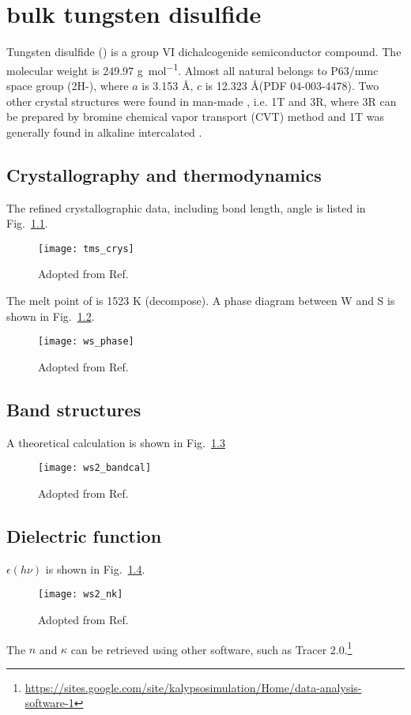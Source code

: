 \chapter{bulk tungsten disulfide}



Tungsten disulfide () is a group VI dichalcogenide semiconductor compound. The molecular weight is 249.97 \si{g\per \mole}. Almost all natural  belongs to P63/mmc space group (2H-), where $a$ is 3.153 \AA, $c$ is 12.323 \AA (PDF 04-003-4478). Two other crystal structures were found in man-made , i.e. 1T and 3R, where 3R can be prepared by bromine chemical vapor transport (CVT) method \cite{Schutte1987} and 1T was generally found in alkaline intercalated .\cite{Yang1996a, Enyashin2011}


\section{Crystallography and thermodynamics}

The refined crystallographic data, including bond length, angle is listed in Fig.~\ref{app:bond}. 

\begin{figure}[htb]
\centering
\texttt{[image: tms\_crys]}
\caption{Adopted from Ref.\cite{Schutte1987}}
\label{app:bond}
\end{figure}

The melt point of  is 1523 K (decompose). A phase diagram between W and S is shown in Fig.~\ref{app:pd}. 

\begin{figure}[htb]
\centering
\texttt{[image: ws\_phase]}
\caption{Adopted from Ref.\cite{Tenne1995,Tenne1998}}
\label{app:pd}
\end{figure}

\section{Band structures}

A theoretical calculation is shown in Fig.~\ref{app:band} 
\begin{figure}[htb]
\centering
\texttt{[image: ws2\_bandcal]}
\caption{Adopted from Ref.\cite{Kuc2011}}
\label{app:band}
\end{figure}



\section{Dielectric function}


$\epsilon(h\nu)$ is shown in Fig.~\ref{app:nk}. 
\begin{figure}[htb]
\centering
\texttt{[image: ws2\_nk]}
\caption{Adopted from Ref.\cite{Hughes1976}}
\label{app:nk}
\end{figure}

The $n$ and $\kappa$ can be retrieved using other software, such as Tracer 2.0.\footnote{\url{https://sites.google.com/site/kalypsosimulation/Home/data-analysis-software-1}}





